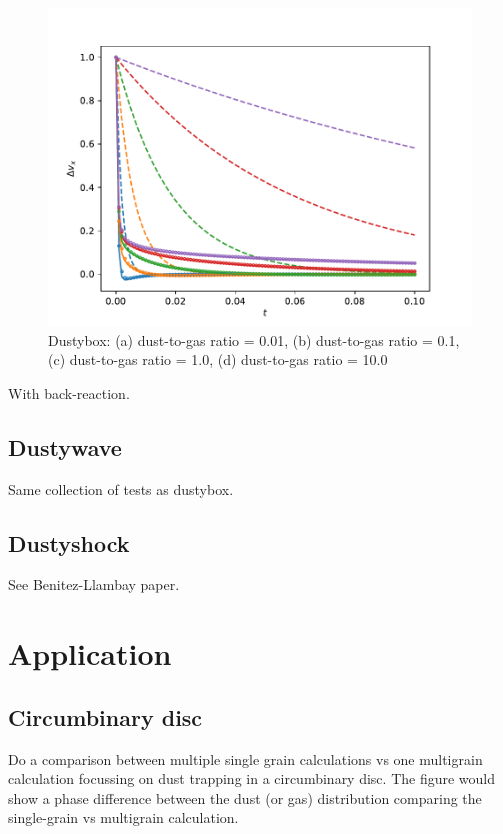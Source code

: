 \documentclass[fleqn,usenatbib]{mnras}
\begin{document}
\begin{figure}
\begin{center}
      \includegraphics[width=\columnwidth]{figs/delta_vx_Epstein-f=10_0.pdf}
      \caption{Dustybox: (a) dust-to-gas ratio = 0.01, (b) dust-to-gas ratio
      = 0.1, (c) dust-to-gas ratio = 1.0, (d) dust-to-gas ratio = 10.0}
    \end{center}
\end{figure}

With back-reaction.

\subsection{Dustywave}

Same collection of tests as dustybox.

\subsection{Dustyshock}
See Benitez-Llambay paper.

\section{Application}

\subsection{Circumbinary disc}

Do a comparison between multiple single grain calculations vs one multigrain
calculation focussing on dust trapping in a circumbinary disc. The figure would
show a phase difference between the dust (or gas) distribution comparing the
single-grain vs multigrain calculation.
\end{document}
